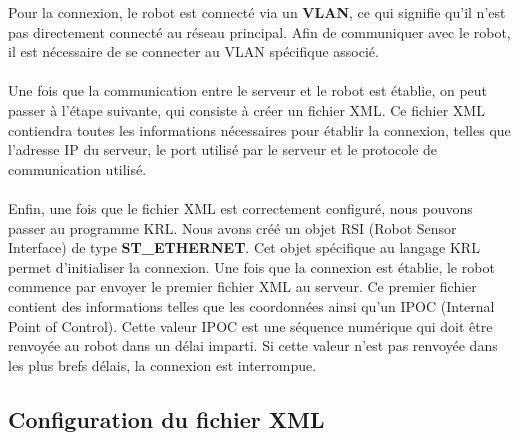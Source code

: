 Pour la connexion, le robot est connecté via un \textbf{VLAN}, ce qui signifie qu'il n'est pas directement connecté au réseau principal.
Afin de communiquer avec le robot, il est nécessaire de se connecter au VLAN spécifique associé.
\\
\\
Une fois que la communication entre le serveur et le robot est établie, on peut passer à l'étape suivante, qui consiste à créer un fichier XML.
Ce fichier XML contiendra toutes les informations nécessaires pour établir la connexion, telles que l'adresse IP du serveur, le port utilisé par le serveur et le protocole de communication utilisé.
\\
\\
Enfin, une fois que le fichier XML est correctement configuré, nous pouvons passer au programme KRL.
Nous avons créé un objet RSI (Robot Sensor Interface) de type \textbf{ST\_ETHERNET}.
Cet objet spécifique au langage KRL permet d'initialiser la connexion.
Une fois que la connexion est établie, le robot commence par envoyer le premier fichier XML au serveur.
Ce premier fichier contient des informations telles que les coordonnées ainsi qu'un IPOC (Internal Point of Control).
Cette valeur IPOC est une séquence numérique qui doit être renvoyée au robot dans un délai imparti.
Si cette valeur n'est pas renvoyée dans les plus brefs délais, la connexion est interrompue.

\subsection{Configuration du fichier XML}

